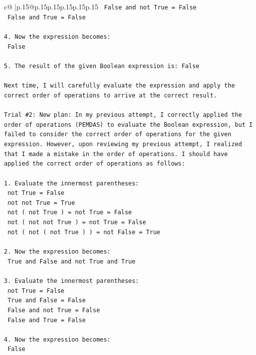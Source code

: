\documentclass{article}
\begin{document}
{\begin{supertabular}{c@{$\;$}|p{.15\linewidth}@{}p{.15\linewidth}p{.15\linewidth}p{.15\linewidth}p{.15\linewidth}p{.15\linewidth}}
{{{\texttt{   False and not True = False} \\
\texttt{   False and True = False} \\
\\ 
\texttt{4. Now the expression becomes: } \\
\texttt{   False} \\
\\ 
\texttt{5. The result of the given Boolean expression is: False} \\
\\ 
\texttt{Next time, I will carefully evaluate the expression and apply the correct order of operations to arrive at the correct result.} \\
\\ 
\texttt{Trial \#2: New plan: In my previous attempt, I correctly applied the order of operations (PEMDAS) to evaluate the Boolean expression, but I failed to consider the correct order of operations for the given expression. However, upon reviewing my previous attempt, I realized that I made a mistake in the order of operations. I should have applied the correct order of operations as follows:} \\
\\ 
\texttt{1. Evaluate the innermost parentheses: } \\
\texttt{   not True = False} \\
\texttt{   not not True = True} \\
\texttt{   not ( not True ) = not True = False} \\
\texttt{   not ( not not True ) = not True = False} \\
\texttt{   not ( not ( not True ) ) = not False = True} \\
\\ 
\texttt{2. Now the expression becomes: } \\
\texttt{   True and False and not True and True} \\
\\ 
\texttt{3. Evaluate the innermost parentheses: } \\
\texttt{   not True = False} \\
\texttt{   True and False = False} \\
\texttt{   False and not True = False} \\
\texttt{   False and True = False} \\
\\ 
\texttt{4. Now the expression becomes: } \\
\texttt{   False} \\
}}}
\end{supertabular}}
\end{document}
